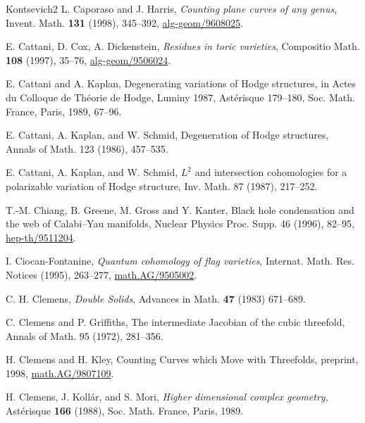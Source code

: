 \begin{thebibliography}{Kontsevich2}
\hypertarget{bib:CH3}{} L. Caporaso and J. Harris, \emph{Counting plane curves of any genus}, Invent. Math. \textbf{131} (1998), 345--392, \href{https://arxiv.org/abs/alg-geom/9608025}{alg-geom/9608025}.

\hypertarget{bib:CCD}{} E. Cattani, D. Cox, A. Dickenstein, \emph{Residues in toric varieties}, Compositio Math. \textbf{108} (1997), 35--76, \href{https://arxiv.org/abs/alg-geom/9506024}{alg-geom/9506024}.

\hypertarget{bib:CaK}{}
E. Cattani and A. Kaplan, Degenerating variations of Hodge structures, in Actes du
Colloque de Théorie de Hodge, Luminy 1987, Astérisque 179--180,
Soc. Math. France, Paris, 1989, 67--96.

\hypertarget{bib:CKS1}{}
E. Cattani, A. Kaplan, and W. Schmid, Degeneration of Hodge structures, Annals of Math. 123 (1986), 457--535.

\hypertarget{bib:CKS2}{}
E. Cattani, A. Kaplan, and W. Schmid, $L^2$ and intersection cohomologies for a polarizable variation of Hodge structure, Inv. Math. 87 (1987), 217--252.

\hypertarget{bib:CGGK}{}
T.-M. Chiang, B. Greene, M. Gross and Y. Kanter, Black hole condensation and the web of Calabi--Yau manifolds, Nuclear Physics Proc. Supp. 46 (1996), 82--95, \href{https://arxiv.org/abs/hep-th/9511204}{hep-th/9511204}.


\hypertarget{bib:CiocanF}{} I. Ciocan-Fontanine, \emph{Quantum cohomology of flag varieties}, Internat. Math. Res. Notices (1995), 263--277, \href{https://arxiv.org/abs/alg-geom/9505002}{math.AG/9505002}.

\hypertarget{bib:Clemens}{} C. H. Clemens, \emph{Double Solids}, Advances in Math. \textbf{47} (1983) 671--689.

\hypertarget{bib:CG}{}
C. Clemens and P. Griffiths, The intermediate Jacobian of the cubic threefold,
Annals of Math. 95 (1972), 281--356.

\hypertarget{bib:ClK}{}
H. Clemens and H. Kley, Counting Curves which Move with Threefolds, preprint, 1998, \href{https://arxiv.org/abs/math.AG/9807109}{math.AG/9807109}.

\hypertarget{bib:CKM}{} H. Clemens, J. Kollár, and S. Mori, \emph{Higher dimensional complex geometry}, Astérisque \textbf{166} (1988), Soc. Math. France, Paris, 1989.


\end{thebibliography}
